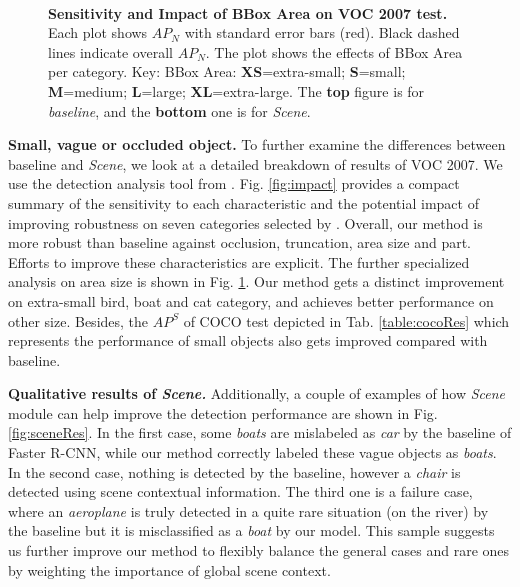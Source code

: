 \documentclass[10pt,twocolumn,letterpaper]{article}
\begin{document}
{\begin{figure}[t]
\end{figure}

\begin{figure}[t]
\centering
\vspace{-2ex}
\hspace{-3ex}
\\
\hspace{-3ex}
\caption{{\bf Sensitivity and Impact of BBox Area on VOC 2007 test.} Each plot shows $AP_N$ \cite{Error} with standard error bars (red). Black dashed lines indicate overall $AP_N$. The plot shows the effects of BBox Area per category. Key: BBox Area: {\bf XS}=extra-small; {\bf S}=small; {\bf M}=medium; {\bf L}=large; {\bf XL}=extra-large. The {\bf top} figure is for {\em baseline}, and the {\bf bottom} one is for {\em Scene}. }
\label{fig:area}
\vspace{-2ex}
\end{figure}

{\bf Small, vague or occluded object.} To further examine the differences between baseline and {\em Scene}, we look at a detailed breakdown of results of VOC 2007. We use the detection analysis tool from \cite{Error}. Fig. \ref{fig:impact} provides a compact summary of the sensitivity to each characteristic and the potential impact of improving robustness on seven categories selected by \cite{Error}. Overall, our method is more robust than baseline against occlusion, truncation, area size and part. Efforts to improve these characteristics are explicit. The further specialized analysis on area size is shown in Fig. \ref{fig:area}. Our method gets a distinct improvement on extra-small bird, boat and cat category, and achieves better performance on other size. Besides, the $AP^S$ of COCO test depicted in Tab. \ref{table:cocoRes} which represents the performance of small objects also gets improved compared with baseline. 

{\bf Qualitative results of \em Scene.} Additionally, a couple of examples of how {\em Scene} module can help improve the detection performance are shown in Fig. {\ref{fig:sceneRes}}. In the first case, some {\em boats} are mislabeled as {\em car} by the baseline of Faster R-CNN, while our method correctly labeled these vague objects as {\em boats}. In the second case, nothing is detected by the baseline, however a {\em chair} is detected using scene contextual information. The third one is a failure case, where an {\em aeroplane} is truly detected in a quite rare situation (on the river) by the baseline but it is misclassified as a {\em boat} by our model. This sample suggests us further improve our method to flexibly balance the general cases and rare ones by weighting the importance of global scene context.

}
\end{document}
